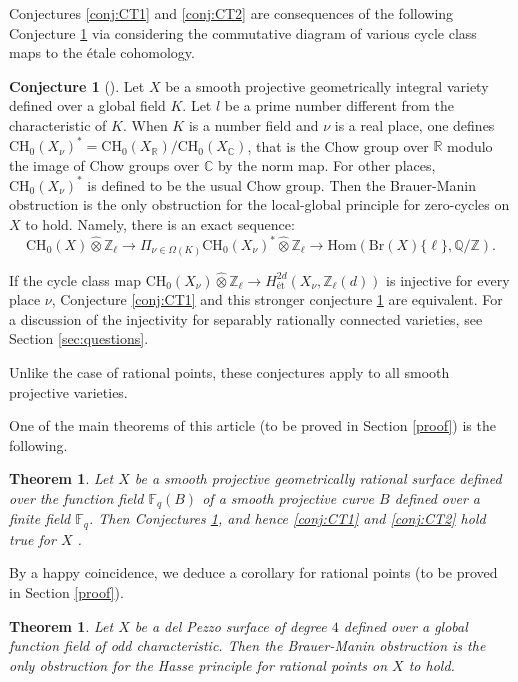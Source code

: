\documentclass{amsart}
\newtheorem{thm}[theorem]{Theorem}
\theoremstyle{definition}
\newtheorem{conj}[theorem]{Conjecture}
\theoremstyle{remark}
\newcommand{\mbb}{\mathbb}
\newcommand{\FF}{\mbb{F}}
\newcommand{\QQ}{\mbb{Q}}
\newcommand{\ZZ}{\mbb{Z}}
\newcommand{\CC}{\mbb{C}}
\newcommand{\RR}{\mbb{R}}
\begin{document}
Conjectures \ref{conj:CT1} and \ref{conj:CT2} are consequences of the following Conjecture \ref{conj:E} via considering the commutative diagram of various cycle class maps to the \'etale cohomology.
\begin{conj}[{\cite[Conjecture 4.2]{CT_Problem_list}}]\label{conj:E}
Let $X$ be a smooth projective geometrically integral variety defined over a global field $K$. Let $l$ be a prime number different from the characteristic of $K$. 
When $K$ is a number field and $\nu$ is a real place, one defines $\text{CH}_0(X_\nu)^*=\text{CH}_0(X_\RR)/\text{CH}_0(X_\CC)$, that is the Chow group over $\RR$ modulo the image of Chow groups over $\CC$ by the norm map. For other places, $\text{CH}_0(X_\nu)^*$ is defined to be the usual Chow group.
Then the Brauer-Manin obstruction is the only obstruction for the local-global principle for zero-cycles on $X$ to hold. Namely, there is an exact sequence:
\[
\text{CH}_0(X) \hat{\otimes} \ZZ_\ell \to \Pi_{\nu \in \Omega(K)} \text{CH}_0(X_\nu)^* \hat{\otimes} \ZZ_\ell \to \text{Hom}(\text{Br}(X)\{\ell\}, \QQ/\ZZ).
\]
\end{conj}




If the cycle class map $\text{CH}_0(X_\nu) \hat{\otimes} \ZZ_{\ell} \to H^{2d}_{\text{\'et}}(X_\nu, \ZZ_{\ell}(d))$ is injective for every place $\nu$, Conjecture \ref{conj:CT1} and this stronger conjecture \ref{conj:E} are equivalent.
For a discussion of the injectivity for separably rationally connected varieties, see Section \ref{sec:questions}.

Unlike the case of rational points, these conjectures apply to all smooth projective varieties.




One of the main theorems of this article (to be proved in Section \ref{proof}) is the following.
\begin{thm}\label{thm:zerocycle}
Let $X$ be a smooth projective geometrically rational surface defined over the function field $\FF_q(B)$ of a smooth projective curve $B$ defined over a finite field $\FF_q$. Then Conjectures \ref{conj:E}, and hence \ref{conj:CT1} and \ref{conj:CT2} hold true for $X$ .
\end{thm}

By a happy coincidence, we deduce a corollary for rational points (to be proved in Section \ref{proof}).
\begin{thm}\label{thm:delpezzo4}
Let $X$ be a del Pezzo surface of degree $4$ defined over a global function field of odd characteristic. Then the Brauer-Manin obstruction is the only obstruction for the Hasse principle for rational points on $X$ to hold.
\end{thm}
\end{document}
